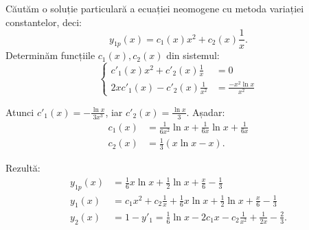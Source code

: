 \documentclass[11pt,a4paper]{article}
\theoremstyle{dotless}
\theoremstyle{dotlessdr}
\begin{document}
Căutăm o soluție particulară a ecuației neomogene cu metoda variației constantelor,
deci:
\[
  y_{1p}(x) = c_1(x) x^2 + c_2(x) \frac{1}{x}.
\]
Determinăm funcțiile $c_1(x), c_2(x)$ din sistemul:
\[
  \begin{cases}
    c'_1(x) x^2 + c'_2(x) \frac{1}{x} &= 0 \\
    2xc'_1(x) - c'_2(x) \frac{1}{x^2} &= \frac{-x^2 \ln x}{x^2}
  \end{cases}
\]

Atunci $c'_1(x) = -\frac{\ln x}{3x^3}$, iar $c'_2(x) = \frac{\ln x}{3}$.
Așadar:
\begin{align*}
  c_1(x) &= \frac{1}{6x^2} \ln x + \frac{1}{6x} \ln x + \frac{1}{6x} \\
  c_2(x) &= \frac{1}{3} (x \ln x - x).
\end{align*}

Rezultă:
\begin{align*}
  y_{1p}(x) &= \frac{1}{6} x \ln x + \frac{1}{2} \ln x + \frac{x}{6} - \frac{1}{3} \\
  y_1(x) &= c_1 x^2 + c_2 \frac{1}{x} + \frac{1}{6} x \ln x + \frac{1}{2} \ln x + %
           \frac{x}{6} - \frac{1}{3} \\
  y_2(x) &= 1 - y'_1 = \frac{1}{6} \ln x - 2c_1 x - c_2 \frac{1}{x^2} + \frac{1}{2x} - \frac{2}{3}.
\end{align*}
\end{document}
